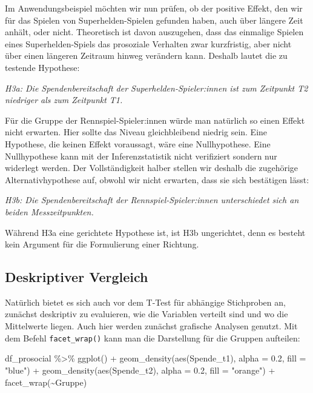 \documentclass[
]{book}
\newenvironment{Shaded}{\begin{snugshade}}{\end{snugshade}}
\newcommand{\AttributeTok}[1]{\textcolor[rgb]{0.77,0.63,0.00}{#1}}
\newcommand{\FloatTok}[1]{\textcolor[rgb]{0.00,0.00,0.81}{#1}}
\newcommand{\FunctionTok}[1]{\textcolor[rgb]{0.00,0.00,0.00}{#1}}
\newcommand{\NormalTok}[1]{#1}
\newcommand{\SpecialCharTok}[1]{\textcolor[rgb]{0.00,0.00,0.00}{#1}}
\newcommand{\StringTok}[1]{\textcolor[rgb]{0.31,0.60,0.02}{#1}}
\begin{document}
Im Anwendungsbeispiel möchten wir nun prüfen, ob der positive Effekt, den wir für das Spielen von Superhelden-Spielen gefunden haben, auch über längere Zeit anhält, oder nicht. Theoretisch ist davon auszugehen, dass das einmalige Spielen eines Superhelden-Spiels das prosoziale Verhalten zwar kurzfristig, aber nicht über einen längeren Zeitraum hinweg verändern kann. Deshalb lautet die zu testende Hypothese:

\emph{H3a: Die Spendenbereitschaft der Superhelden-Spieler:innen ist zum Zeitpunkt T2 niedriger als zum Zeitpunkt T1.}

Für die Gruppe der Rennspiel-Spieler:innen würde man natürlich so einen Effekt nicht erwarten. Hier sollte das Niveau gleichbleibend niedrig sein. Eine Hypothese, die keinen Effekt voraussagt, wäre eine Nullhypothese. Eine Nullhypothese kann mit der Inferenzstatistik nicht verifiziert sondern nur widerlegt werden. Der Vollständigkeit halber stellen wir deshalb die zugehörige Alternativhypothese auf, obwohl wir nicht erwarten, dass sie sich bestätigen lässt:

\emph{H3b: Die Spendenbereitschaft der Rennspiel-Spieler:innen unterschiedet sich an beiden Messzeitpunkten.}

Während H3a eine gerichtete Hypothese ist, ist H3b ungerichtet, denn es besteht kein Argument für die Formulierung einer Richtung.

\hypertarget{deskriptiver-vergleich}{%
\subsection{Deskriptiver Vergleich}\label{deskriptiver-vergleich}}

Natürlich bietet es sich auch vor dem T-Test für abhängige Stichproben an, zunächst deskriptiv zu evaluieren, wie die Variablen verteilt sind und wo die Mittelwerte liegen. Auch hier werden zunächst grafische Analysen genutzt. Mit dem Befehl \texttt{facet\_wrap()} kann man die Darstellung für die Gruppen aufteilen:

\begin{Shaded}
\begin{Highlighting}[]
\NormalTok{df\_prosocial }\SpecialCharTok{\%\textgreater{}\%} 
  \FunctionTok{ggplot}\NormalTok{() }\SpecialCharTok{+}
  \FunctionTok{geom\_density}\NormalTok{(}\FunctionTok{aes}\NormalTok{(Spende\_t1), }\AttributeTok{alpha =} \FloatTok{0.2}\NormalTok{, }\AttributeTok{fill =} \StringTok{"blue"}\NormalTok{) }\SpecialCharTok{+}
  \FunctionTok{geom\_density}\NormalTok{(}\FunctionTok{aes}\NormalTok{(Spende\_t2), }\AttributeTok{alpha =} \FloatTok{0.2}\NormalTok{, }\AttributeTok{fill =} \StringTok{"orange"}\NormalTok{) }\SpecialCharTok{+}
  \FunctionTok{facet\_wrap}\NormalTok{(}\SpecialCharTok{\textasciitilde{}}\NormalTok{Gruppe)}
\end{Highlighting}
\end{Shaded}
\end{document}
